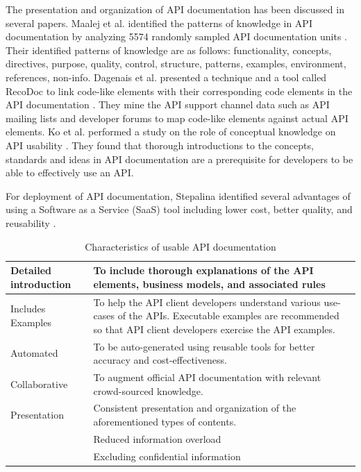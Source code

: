 \documentclass[11pt,oneside]{book}
\begin{document}
The presentation and organization of API documentation has been discussed in several papers. Maalej et al. identified the patterns of knowledge in API documentation by analyzing 5574 randomly sampled API documentation units \cite{maalej2013patterns}. Their identified patterns of knowledge are as follows: functionality, concepts, directives, purpose, quality, control, structure, patterns, examples, environment, references, non-info. Dagenais et al. presented a technique and a tool called RecoDoc to link code-like elements with their corresponding code elements in the API documentation \cite{dagenais2012recovering}. They mine the API support channel data such as API mailing lists and developer forums to map code-like elements against actual API elements. Ko et al. performed a study on the role of conceptual knowledge on API usability \cite{ko2011role}. They found that thorough introductions to the concepts, standards and ideas in API documentation are a prerequisite for developers to be able to effectively use an API.

For deployment of API documentation, Stepalina identified several advantages of using a Software as a Service (SaaS) tool including lower cost, better quality, and reusability \cite{Stepalina_saas}.


\begin{table}[!tbh]
  \caption{Characteristics of usable API documentation}
  \label{table:good_apis}
\begin{tabular}{|p{1.5in} | p{3in}|}
\hline
Detailed introduction &
To include thorough explanations of the API elements, business models, and associated rules \\
\hline
Includes Examples &
To help the API client developers understand various use-cases of the APIs. Executable examples are recommended so that API client developers exercise the API examples. \\
\hline
Automated &
To be auto-generated using reusable tools for better accuracy and cost-effectiveness. \\
\hline
Collaborative &
To augment official API documentation with relevant crowd-sourced knowledge. \\
\hline
Presentation &
Consistent presentation and organization of the aforementioned types of contents. \\
& Reduced information overload\\
& Excluding confidential information\\
\hline
\end{tabular}
\end{table}
\end{document}
